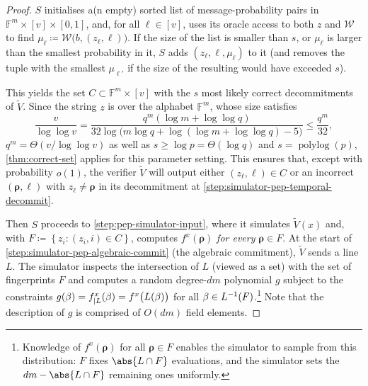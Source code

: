 \documentclass[10pt,a4paper]{article}
\theoremstyle{definition}
\newcommand{\field}{\mathbb{F}}
\renewcommand{\set}[1]{\left\{#1\right\}}
\newcommand{\polylog}{\operatorname{polylog}}
\newcommand{\vcommitlength}{v}
\newcommand{\vcommitstring}{z}
\newcommand{\pcommitlength}{p}
\newcommand{\dimension}{m}
\newcommand{\degree}{d}
\newcommand{\fieldsize}{q}
\newcommand{\fingerprinttuple}{\bm{\rho}}
\renewcommand{\line}{L}
\newcommand{\snapshot}{b}
\newcommand{\whiteboxoracle}{\mathcal{W}}
\def\fe#1{
    \ifnum#1=1
        \alpha
    \else
    \ifnum#1=2
        \beta
    \else
    \ifnum#1=3
        \gamma
    \fi\fi\fi
}
\begin{document}
\begin{proof}
    $S$ initialises a(n empty) sorted list of message-probability pairs in $\field^\dimension \times [\vcommitlength] \times [0,1]$, and, for all $\ell \in [\vcommitlength]$, uses its oracle access to both $\vcommitstring$ and $\whiteboxoracle$ to find $\mu_\ell \coloneqq \whiteboxoracle\big(\snapshot,(\vcommitstring_\ell, \ell)\big)$. If the size of the list is smaller than $s$, or $\mu_\ell$ is larger than the smallest probability in it, $S$ adds $(z_\ell, \ell, \mu_\ell)$ to it (and removes the tuple with the smallest $\mu_{\ell'}$ if the size of the resulting would have exceeded $s$). 
    
    This yields the set $C \subset \field^\dimension \times [\vcommitlength]$ with the $s$ most likely correct decommitments of $\widetilde V$. Since the string $\vcommitstring$ is over the alphabet $\field^\dimension$, whose size satisfies
    \begin{equation*}
        \frac{\vcommitlength}{\log\log \vcommitlength} = \frac{\fieldsize^\dimension (\log \dimension + \log\log \fieldsize)}{32 \log \big(\dimension \log \fieldsize + \log(\log \dimension + \log\log \fieldsize) - 5\big)} \leq \frac{\fieldsize^\dimension}{32},
    \end{equation*}
    $\fieldsize^\dimension = \Theta(\vcommitlength / \log\log \vcommitlength)$ as well as $s \geq \log \pcommitlength = \Theta(\log \fieldsize)$ and $s = \polylog(\pcommitlength)$, \cref{thm:correct-set} applies for this parameter setting. This ensures that, except with probability $o(1)$, the verifier $\widetilde V$ will output either $(z_\ell, \ell) \in C$ or an incorrect $(\fingerprinttuple, \ell)$ with $\vcommitstring_\ell \neq \fingerprinttuple$ in its decommitment at \cref{step:simulator-pep-temporal-decommit}. 
    
    Then $S$ proceeds to \cref{step:pep-simulator-input}, where it simulates $\widetilde V(x)$ and, with $F \coloneqq \set{\vcommitstring_i : (\vcommitstring_i, i) \in C}$, computes $f^x(\fingerprinttuple)$ \emph{for every} $\fingerprinttuple \in F$.
    At the start of \cref{step:simulator-pep-algebraic-commit} (the algebraic commitment), $\widetilde V$ sends a line $\line$. The simulator inspects the intersection of $L$ (viewed as a set) with the set of fingerprints $F$ and computes a random degree-$\degree\dimension$ polynomial $g$ subject to the constraints $g(\fe2) = f^x_{|\line}(\fe2) = f^x\big(\line(\fe2)\big)$ for all $\fe2 \in \line^{-1}(F)$.\footnote{Knowledge of $f^x(\fingerprinttuple)$ for all $\fingerprinttuple \in F$ enables the simulator to sample from this distribution: $F$ fixes $\abs{\line \cap F}$ evaluations, and the simulator sets the $\degree\dimension - \abs{\line \cap F}$ remaining ones uniformly.} Note that the description of $g$ is comprised of $O(\degree\dimension)$ field elements.
    

\end{proof}
\end{document}

